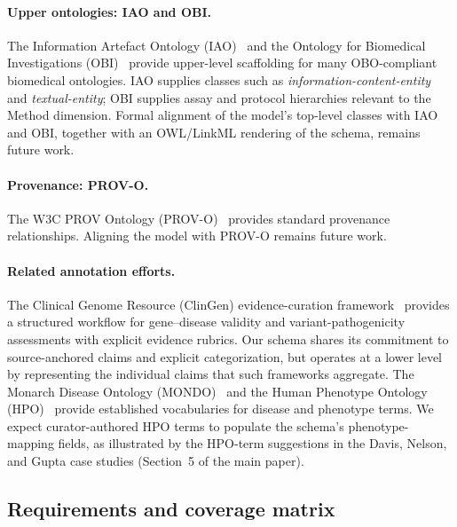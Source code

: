 \paragraph{Upper ontologies: IAO and OBI.}
The Information Artefact Ontology (IAO)~\cite{iao2015} and the Ontology for
Biomedical Investigations (OBI)~\cite{obi2016} provide upper-level
scaffolding for many OBO-compliant biomedical ontologies. IAO supplies
classes such as \emph{information-content-entity} and
\emph{textual-entity}; OBI supplies assay and protocol hierarchies relevant
to the Method dimension. Formal alignment of the model's top-level classes
with IAO and OBI, together with an OWL/LinkML rendering of the schema,
remains future work.

\paragraph{Provenance: PROV-O.}
The W3C PROV Ontology (PROV-O)~\cite{prov_o} provides standard provenance
relationships. Aligning the model with PROV-O remains future work.

\paragraph{Related annotation efforts.}
The Clinical Genome Resource (ClinGen) evidence-curation
framework~\cite{clingen2018} provides a structured workflow for gene--disease
validity and variant-pathogenicity assessments with explicit evidence
rubrics. Our schema shares its commitment to source-anchored claims and
explicit categorization, but operates at a lower level by representing the
individual claims that such frameworks aggregate. The Monarch Disease Ontology
(MONDO)~\cite{mondo} and the Human Phenotype Ontology (HPO)~\cite{hpo}
provide established vocabularies for disease and phenotype terms. We expect
curator-authored HPO terms to populate the schema's phenotype-mapping fields,
as illustrated by the HPO-term suggestions in the Davis, Nelson, and Gupta
case studies (Section~5 of the main paper).

\subsection{Requirements and coverage matrix}
\label{sec:supp-coverage-matrix}


